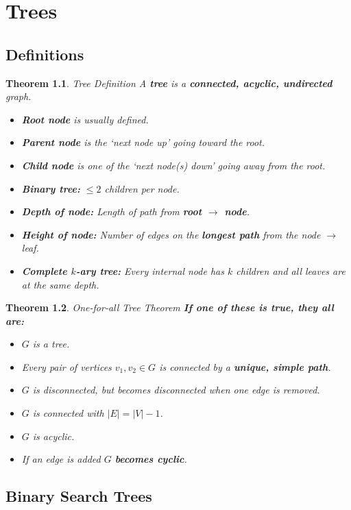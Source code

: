 \documentclass[a4paper,12pt]{report}
\newtheorem{theorem}{Theorem}
\begin{document}
\chapter{Trees}

\section{Definitions}

\begin{theorem}{Tree Definition}
A \textbf{tree} is a \textbf{connected, acyclic, undirected} graph.
\begin{itemize}
\item \textbf{Root node} is usually defined.
\item \textbf{Parent node} is the `next node up' going toward the root.
\item \textbf{Child node} is one of the `next node(s) down' going away from the root.
\item \textbf{Binary tree: } $\leq 2$ children per node.
\item \textbf{Depth of node: } Length of path from \textbf{root $\to$ node}.
\item \textbf{Height of node: } Number of edges on the \textbf{longest path} from the node $\to$ leaf. 
\item \textbf{Complete $k$-ary tree: } Every \textit{internal node} has $k$ children and all leaves are at the same depth.
\end{itemize}
\end{theorem}


\begin{theorem}{One-for-all Tree Theorem}
\textbf{If one of these is true, they all are: } 
\begin{itemize}
\item $G$ is a tree.
\item Every pair of vertices $v_1, v_2\in G$ is connected by a \textbf{unique, simple path}.
\item $G$ is disconnected, but becomes disconnected when one edge is removed.
\item $G$ is connected with $|E| = |V|-1$.
\item $G$ is acyclic.
\item If an edge is added $G$ \textbf{becomes cyclic}.
\end{itemize}
\end{theorem}



\section{Binary Search Trees}
\end{document}
